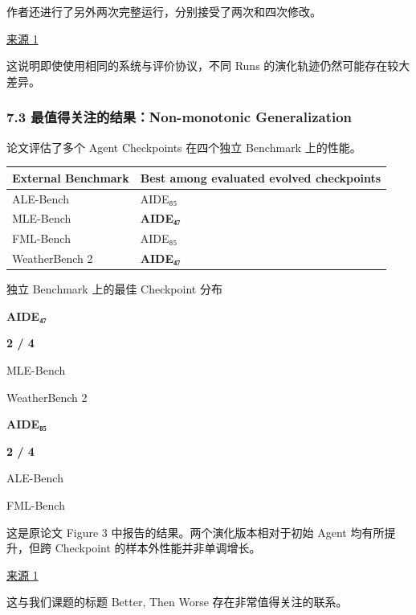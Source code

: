 作者还进行了另外两次完整运行，分别接受了两次和四次修改。

\href{https://arxiv.org/html/2609.26457v1}{来源 1}

这说明即使使用相同的系统与评价协议，不同 Runs 的演化轨迹仍然可能存在较大差异。

\hypertarget{part-3-44-0001-ux6700ux503cux5f97ux5173ux6ce8ux7684ux7ed3ux679cnon-monotonic-generalization}{%
\subsubsection{7.3 最值得关注的结果：Non-monotonic Generalization}\label{part-3-44-0001-ux6700ux503cux5f97ux5173ux6ce8ux7684ux7ed3ux679cnon-monotonic-generalization}}

论文评估了多个 Agent Checkpoints 在四个独立 Benchmark 上的性能。

\begin{readertable}
\begin{longtable}[]{@{}
  >{\raggedright\arraybackslash}p{}
  >{\raggedright\arraybackslash}p{}@{}}
\toprule
External Benchmark & Best among evaluated evolved checkpoints \\
\midrule
\endhead
ALE-Bench & AIDE₈₅ \\
MLE-Bench & \textbf{AIDE₄₇} \\
FML-Bench & AIDE₈₅ \\
WeatherBench 2 & \textbf{AIDE₄₇} \\
\bottomrule
\end{longtable}
\end{readertable}

独立 Benchmark 上的最佳 Checkpoint 分布

\textbf{AIDE₄₇}

\textbf{2 / 4}

MLE-Bench

WeatherBench 2

\textbf{AIDE₈₅}

\textbf{2 / 4}

ALE-Bench

FML-Bench

这是原论文 Figure 3 中报告的结果。两个演化版本相对于初始 Agent 均有所提升，但跨 Checkpoint 的样本外性能并非单调增长。

\href{https://arxiv.org/html/2609.26457v1}{来源 1}

这与我们课题的标题 Better, Then Worse 存在非常值得关注的联系。

